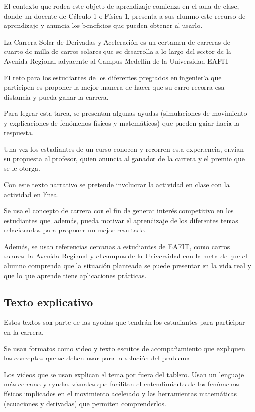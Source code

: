 \documentclass[twoside,letterpaper,11pt]{report}
\begin{document}
El contexto que rodea este objeto de aprendizaje comienza en el aula de clase, donde un docente de Cálculo 1 o Física 1, presenta a sus alumno este recurso de aprendizaje y anuncia los beneficios que pueden obtener al usarlo.

La Carrera Solar de Derivadas y Aceleración es un certamen de carreras de cuarto de milla de carros solares que se desarrolla a lo largo del sector de la Avenida Regional adyacente al Campus Medellín de la Universidad EAFIT.

El reto para los estudiantes de los diferentes pregrados en ingeniería que participen es proponer la mejor manera de hacer que su carro recorra esa distancia y pueda ganar la carrera.

Para lograr esta tarea, se presentan algunas ayudas (simulaciones de movimiento y explicaciones de fenómenos físicos y matemáticos) que pueden guiar hacia la respuesta.

Una vez los estudiantes de un curso conocen y recorren esta experiencia, envían su propuesta al profesor, quien anuncia al ganador de la carrera y el premio que se le otorga.

Con este texto narrativo se pretende involucrar la actividad en clase con la actividad en línea. 

Se usa el concepto de carrera con el fin de generar interés competitivo en los estudiantes que, además, pueda motivar el aprendizaje de los diferentes temas relacionados para proponer un mejor resultado.

Además, se usan referencias cercanas a estudiantes de EAFIT, como carros solares, la Avenida Regional y el campus de la Universidad con la meta de que el alumno comprenda que la situación planteada se puede presentar en la vida real y que lo que aprende tiene aplicaciones prácticas.


\subsection{Texto explicativo} %
\label{sub:texto_explicativo}

Estos textos son parte de las ayudas que tendrán los estudiantes para participar en la carrera.

Se usan formatos como video y texto escritos de acompañamiento que expliquen los conceptos que se deben usar para la solución del problema.

Los videos que se usan explican el tema por fuera del tablero. Usan un lenguaje más cercano y ayudas visuales que facilitan el entendimiento de los fenómenos físicos implicados en el movimiento acelerado y las herramientas matemáticas (ecuaciones y derivadas) que permiten comprenderlos.
\end{document}
